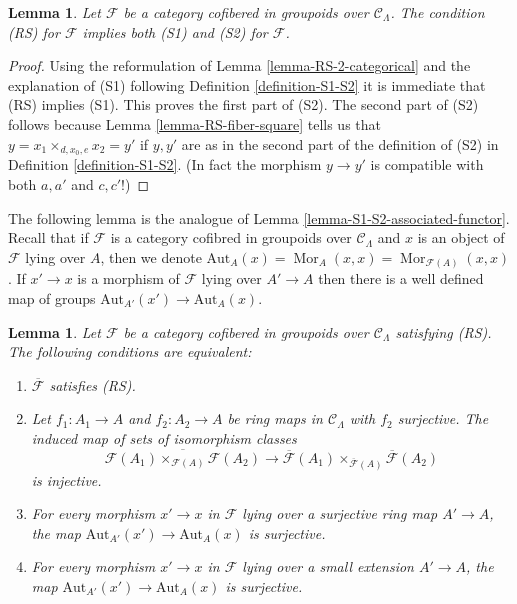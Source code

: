 \documentclass{stacks-project}
\theoremstyle{plain}
\newtheorem{lemma}[subsection]{Lemma}
\theoremstyle{definition}
\theoremstyle{remark}
\numberwithin{equation}{subsection}
\def\Mor{\mathop{\mathrm{Mor}}\nolimits}
\begin{document}
\begin{lemma}
\label{lemma-RS-implies-S1-S2}
Let $\mathcal{F}$ be a category cofibered in groupoids over
$\mathcal{C}_\Lambda$. The condition (RS) for $\mathcal{F}$
implies both (S1) and (S2) for $\mathcal{F}$.
\end{lemma}

\begin{proof}
Using the reformulation of
Lemma \ref{lemma-RS-2-categorical}
and the explanation of (S1) following
Definition \ref{definition-S1-S2}
it is immediate that (RS) implies (S1).
This proves the first part of (S2). The second part of (S2)
follows because
Lemma \ref{lemma-RS-fiber-square}
tells us that $y = x_1 \times_{d, x_0, e} x_2 = y'$ if
$y, y'$ are as in the second part of the definition of (S2) in
Definition \ref{definition-S1-S2}. (In fact the morphism
$y \to y'$ is compatible with both $a, a'$ and $c, c'$!)
\end{proof}

\noindent
The following lemma is the analogue of
Lemma \ref{lemma-S1-S2-associated-functor}.
Recall that if $\mathcal{F}$ is a category cofibred in groupoids over
$\mathcal{C}_\Lambda$ and $x$ is an object of $\mathcal{F}$
lying over $A$, then we denote
$\text{Aut}_A(x) = \Mor_A(x, x) = \Mor_{\mathcal{F}(A)}(x, x)$.
If $x' \to x$ is a morphism of $\mathcal{F}$ lying over $A' \to A$
then there is a well defined map of groups
$\text{Aut}_{A'}(x') \to \text{Aut}_A(x)$.

\begin{lemma}
\label{lemma-RS-associated-functor}
Let $\mathcal{F}$ be a category cofibered in groupoids over
$\mathcal{C}_\Lambda$ satisfying (RS).
The following conditions are equivalent:
\begin{enumerate}
\item $\overline{\mathcal{F}}$ satisfies (RS).
\item Let $f_1: A_1 \to A$ and $f_2: A_2 \to A$ be ring maps in
$\mathcal{C}_\Lambda$ with $f_2$ surjective. The induced map
of sets of isomorphism classes
$$
\overline{\mathcal{F}(A_1) \times_{\mathcal{F}(A)} \mathcal{F}(A_2)}
\to \overline{\mathcal{F}}(A_1) \times_{\overline{\mathcal{F}}(A)}
\overline{\mathcal{F}}(A_2)
$$
is injective.
\item For every morphism $x' \to x$ in $\mathcal{F}$ lying over a
surjective ring map $A' \to A$, the map
$\text{Aut}_{A'}(x') \to \text{Aut}_A(x)$ is surjective.
\item For every morphism $x' \to x$ in $\mathcal{F}$ lying over a small
extension $A' \to A$, the map
$\text{Aut}_{A'}(x') \to \text{Aut}_A(x)$ is surjective.
\end{enumerate}
\end{lemma}
\end{document}
